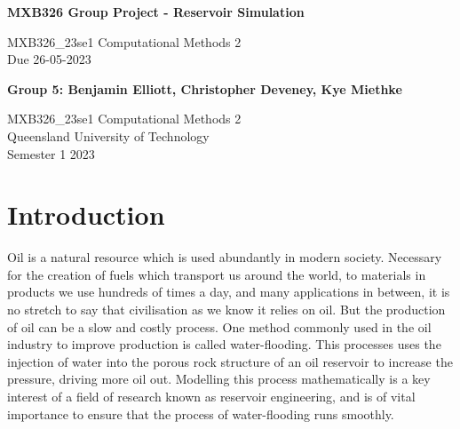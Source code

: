 \documentclass[11pt]{article}
\begin{document}

\begin{titlepage}
   \begin{center}
       \vspace*{6cm}
		
       \begin{large}\textbf{MXB326 Group Project - Reservoir Simulation}\end{large}

       \vspace{0.5cm}
        MXB326\_23se1 Computational Methods 2\\
        Due 26-05-2023
            
       \vspace{1.5cm}

       \textbf{Group 5: Benjamin Elliott, Christopher Deveney, Kye Miethke}

       \vfill
            
       MXB326\_23se1 Computational Methods 2\\
       Queensland University of Technology\\
       Semester 1 2023
            
   \end{center}
\end{titlepage}
\newpage


\tableofcontents
\newpage
{}


\section{Introduction}
Oil is a natural resource which is used abundantly in modern society. Necessary for the creation of fuels which transport us around the world, to materials in products we use hundreds of times a day, and many applications in between, it is no stretch to say that civilisation as we know it relies on oil. But the production of oil can be a slow and costly process. One method commonly used in the oil industry to improve production is called water-flooding. This processes uses the injection of water into the porous rock structure of an oil reservoir to increase the pressure, driving more oil out. Modelling this process mathematically is a key interest of a field of research known as reservoir engineering, and is of vital importance to ensure that the process of water-flooding runs smoothly.\\
\end{document}
